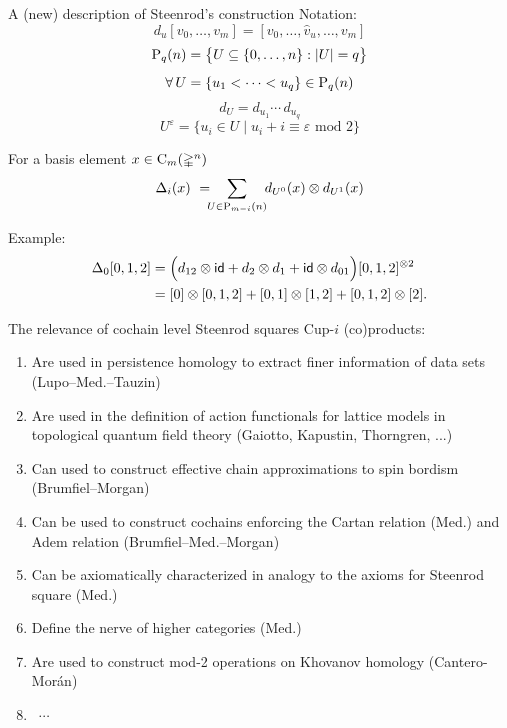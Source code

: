 \documentclass[10pt,t]{beamer} %
\begin{document}
\begin{frame}[fragile]{A (new) description of Steenrod's construction}
	\pause \vskip -5pt \textcolor{pblue}{Notation:} \vspace*{-5pt}
	\[
	d_u[v_0, \dots, v_m] = [v_0, \dots, \widehat v_u, \dots, v_m]
	\]
	\pause \vspace*{-15pt}
	\[
	\mathrm{P}_q(n) = \big\{ U \subseteq \{0,\dots,n\} : \lvert U\rvert = q \big\}
	\]
	\pause \vspace*{-15pt}
	\[
	\forall \, U = \{u_1 < \dots < u_q\} \in \mathrm{P}_q(n)
	\]
	\pause \vspace*{-15pt}
	\[
	d_U = d_{u_1} \dotsm \, d_{u_q}
	\]
	\pause \vspace*{-15pt}
	\[
	U^\varepsilon = \big\{ u_i \in U \mid u_i + i \equiv \varepsilon \text{ mod } 2 \big\}
	\]
	\pause \vskip -10pt
	\begin{definition}[Med.]
		For a basis element $x \in \operatorname{C}_m(\mathbb{\Delta}^n)$
		\vspace*{-5pt}
		\[
		\Delta_i(x) \ = \!\!\! \sum_{U \in \mathrm{P}_{m-i}(n)} \!\! d_{U^0}(x) \otimes d_{U^1}(x)
		\]
		\vspace*{-10pt}
	\end{definition}
	\pause \textcolor{pblue}{Example:} \vspace*{-5pt}
	\begin{align*}
	\Delta_0 [0,1,2] &=
	\Big( d_{12} \otimes \mathsf{id} + d_2 \otimes d_1 + \mathsf{id} \otimes d_{01} \Big) [0,1,2]^{\otimes 2} \\ &=
	[0] \otimes [0,1,2] + [0,1] \otimes [1,2] + [0,1,2] \otimes [2].
	\end{align*}
\end{frame}

\begin{frame}{The relevance of cochain level Steenrod squares}
	\pause \vskip -5pt \textcolor{pblue}{Cup-$i$ (co)products:} \smallskip
	\begin{enumerate}
		\item Are used in persistence homology to extract finer information of data sets (Lupo--Med.--Tauzin) \pause
		\item Are used in the definition of action functionals for lattice models in topological quantum field theory (Gaiotto, Kapustin, Thorngren, ...) \pause
		\item Can used to construct effective chain approximations to spin bordism (Brumfiel--Morgan) \pause
		\item Can be used to construct cochains enforcing the Cartan relation (Med.) and Adem relation (Brumfiel--Med.--Morgan) \pause
		\item Can be axiomatically characterized in analogy to the axioms for Steenrod square (Med.) \pause
		\item Define the nerve of higher categories (Med.) \pause
		\item Are used to construct mod-2 operations on Khovanov homology (Cantero-Mor\'{a}n) \pause
		\item \ $\cdots$
	\end{enumerate}
\end{frame}
\end{document}
